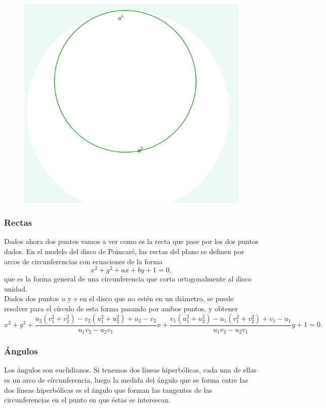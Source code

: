 \documentclass{article}
\theoremstyle{plain}
\theoremstyle{definition}
\theoremstyle{remark}
\begin{document}
\begin{figure}[h]
\includegraphics{Circunferencia.png}
\end{figure}


\subsubsection{Rectas}

Dados ahora dos puntos vamos a ver como es la recta que pase por los
dos puntos dados. En el modelo del disco de Poincaré, las rectas del
plano se definen por arcos de circunferencias con ecuaciones de la
forma
\[x^2+y^2+ax+by+1=0,\]
que es la forma general de una circunferencia que corta ortogonalmente al disco unidad.\\
Dados dos puntos $u$ y $v$ en el disco que no estén en un diámetro, se
puede resolver para el círculo de esta forma pasando por ambos puntos,
y obtener
$$x^{2}+y^{2}+{\frac {u_{2}(v_{1}^{2}+v_{2}^{2})-v_{2}(u_{1}^{2}+u_{2}^{2})+u_{2}-v_{2}}{u_{1}v_{2}-u_{2}v_{1}}}x+{\frac {v_{1}(u_{1}^{2}+u_{2}^{2})-u_{1}(v_{1}^{2}+v_{2}^{2})+v_{1}-u_{1}}{u_{1}v_{2}-u_{2}v_{1}}}y+1=0.$$

\subsubsection{Ángulos}
Los ángulos son euclidianos. Si tenemos dos líneas hiperbólicas, cada
una de ellas es un arco de circunferencia, luego la medida del ángulo
que se forma entre las dos líneas hiperbólicas es el ángulo que forman
las tangentes de las circunferencias en el punto en que éstas se
intersecan.
\end{document}
